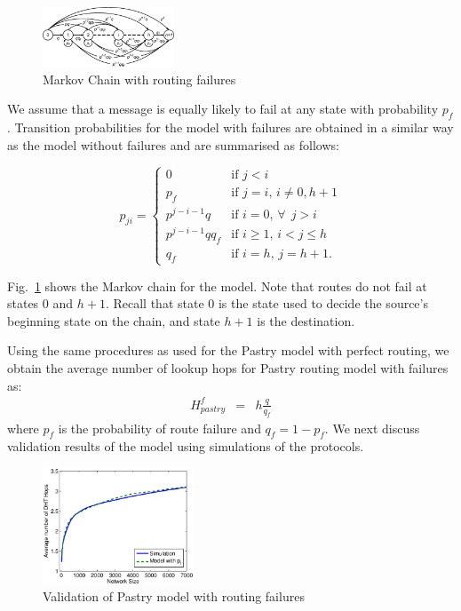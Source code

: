 \documentclass[10pt,twocolumn]{article}
\begin{document}
\begin{figure}[tb] \centering
     {\includegraphics[width=0.35\textwidth]{Markov-WithFail.eps}
     \caption{Markov Chain with routing failures}
     \label{fig.mkv2}}
\end{figure}

We assume that a message is equally likely to fail at any state with
probability $p_f$. Transition probabilities for the model with failures are
obtained in a similar way as the model without failures and are summarised as
follows:

\[ p_{ji} = \left\{ \begin{array}{ll}
         0 & \mbox{if $j < i$}\\
         p_f & \mbox{if $j = i$,  $i \neq 0, h+1 $}\\
         p^{j-i-1}q & \mbox{if $i = 0$, $\forall~~j>i $} \\
         p^{j-i-1}qq_f & \mbox{if $i \ge 1$, $i < j \le h$} \\
         q_f & \mbox{if $i = h$, $j = h+1$}
         .\end{array} \right. \]

Fig.~\ref{fig.mkv2} shows the Markov chain for the model. Note that routes do
not fail at states $0$ and $h+1$. Recall that state $0$ is the state used to
decide the source's beginning state on the chain, and state $h+1$ is the
destination.

Using the same procedures as used for the Pastry model with perfect
routing, we obtain the average number of lookup hops for Pastry
routing model with failures as:
\begin{eqnarray}
H^f_{pastry} &=& h\frac{q}{q_f}
\end{eqnarray}
where $p_f$ is the probability of route failure and $q_f = 1-p_f$.
We next discuss validation results of the model using simulations of
the protocols.

\begin{figure}[tb] \centering
     {\includegraphics[width=0.4\textwidth]{val_past2.eps}
     \caption{Validation of Pastry model with routing failures}
     \label{fig.valid2}}
\end{figure}
\end{document}
